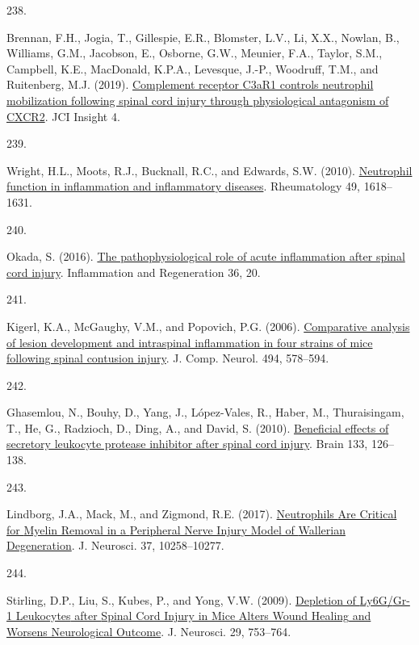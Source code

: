 \documentclass[
]{article}
\newlength{\cslhangindent}
\newlength{\csllabelwidth}
\newlength{\cslentryspacingunit} %
\newenvironment{CSLReferences}[2] %
 {%
  \setlength{\parindent}{0pt}
  \ifodd #1
  \let\oldpar\par
  \def\par{\hangindent=\cslhangindent\oldpar}
  \fi
  \setlength{\parskip}{#2\cslentryspacingunit}
 }%
 {}
\newcommand{\CSLLeftMargin}[1]{\parbox[t]{\csllabelwidth}{#1}}
\newcommand{\CSLRightInline}[1]{\parbox[t]{\linewidth - \csllabelwidth}{#1}\break}
\begin{document}
\begin{CSLReferences}{0}{0}
\leavevmode{}%
\CSLLeftMargin{238. }
\CSLRightInline{Brennan, F.H., Jogia, T., Gillespie, E.R., Blomster, L.V., Li, X.X., Nowlan, B., Williams, G.M., Jacobson, E., Osborne, G.W., Meunier, F.A., Taylor, S.M., Campbell, K.E., MacDonald, K.P.A., Levesque, J.-P., Woodruff, T.M., and Ruitenberg, M.J. (2019). \href{https://doi.org/10.1172/jci.insight.98254}{Complement receptor {C3aR1} controls neutrophil mobilization following spinal cord injury through physiological antagonism of {CXCR2}}. JCI Insight 4.}

\leavevmode{}%
\CSLLeftMargin{239. }
\CSLRightInline{Wright, H.L., Moots, R.J., Bucknall, R.C., and Edwards, S.W. (2010). \href{https://doi.org/10.1093/rheumatology/keq045}{Neutrophil function in inflammation and inflammatory diseases}. Rheumatology 49, 1618--1631.}

\leavevmode{}%
\CSLLeftMargin{240. }
\CSLRightInline{Okada, S. (2016). \href{https://doi.org/10.1186/s41232-016-0026-1}{The pathophysiological role of acute inflammation after spinal cord injury}. Inflammation and Regeneration 36, 20.}

\leavevmode{}%
\CSLLeftMargin{241. }
\CSLRightInline{Kigerl, K.A., McGaughy, V.M., and Popovich, P.G. (2006). \href{https://doi.org/10.1002/cne.20827}{Comparative analysis of lesion development and intraspinal inflammation in four strains of mice following spinal contusion injury}. J. Comp. Neurol. 494, 578--594.}

\leavevmode{}%
\CSLLeftMargin{242. }
\CSLRightInline{Ghasemlou, N., Bouhy, D., Yang, J., López-Vales, R., Haber, M., Thuraisingam, T., He, G., Radzioch, D., Ding, A., and David, S. (2010). \href{https://doi.org/10.1093/brain/awp304}{Beneficial effects of secretory leukocyte protease inhibitor after spinal cord injury}. Brain 133, 126--138.}

\leavevmode{}%
\CSLLeftMargin{243. }
\CSLRightInline{Lindborg, J.A., Mack, M., and Zigmond, R.E. (2017). \href{https://doi.org/10.1523/JNEUROSCI.2085-17.2017}{Neutrophils {Are Critical} for {Myelin Removal} in a {Peripheral Nerve Injury Model} of {Wallerian Degeneration}}. J. Neurosci. 37, 10258--10277.}

\leavevmode{}%
\CSLLeftMargin{244. }
\CSLRightInline{Stirling, D.P., Liu, S., Kubes, P., and Yong, V.W. (2009). \href{https://doi.org/10.1523/JNEUROSCI.4918-08.2009}{Depletion of {Ly6G}/{Gr-1 Leukocytes} after {Spinal Cord Injury} in {Mice Alters Wound Healing} and {Worsens Neurological Outcome}}. J. Neurosci. 29, 753--764.}


\end{CSLReferences}
\end{document}
